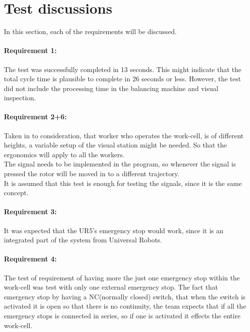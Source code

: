\section{Test discussions}
In this section, each of the requirements will be discussed. 

\paragraph{Requirement 1:}
The test was successfully completed in 13 seconds. This might indicate that the total cycle time is plausible to complete in 26 seconds or less. However, the test did not include the processing time in the balancing machine and visual inspection. 

\paragraph{Requirement 2+6:}
Taken in to consideration, that worker who operates the work-cell, is of different heights, a variable setup of the visual station might be needed. So that the ergonomics will apply to all the workers.\\
The signal needs to be implemented in the program, so whenever the signal is pressed the rotor will be moved in to a different trajectory.\\
It is assumed that this test is enough for testing the signals, since it is the same concept.

\paragraph{Requirement 3:}
It was expected that the UR5's emergency stop would work, since it is an integrated part of the system from Universal Robots. 

\paragraph{Requirement 4:}

The test of requirement of having more the just one emergency stop within the work-cell was test with only one external emergency stop. The fact that emergency stop by having a NC(normally closed) switch, that when the switch is activated it is open so that there is no continuity, the team expects that if all the emergency stops is connected in series, so if one is activated it effects the entire work-cell.  

